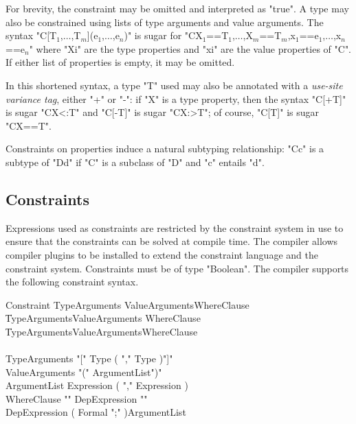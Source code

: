 For brevity, the constraint may be omitted and
interpreted as \xcd"true".
A type may also be constrained using lists of type arguments and
value arguments.
The syntax 
\xcdmath"C[T$_1$,$\dots$,T$_m$](e$_1$,$\dots$,e$_n$)" is sugar for
\xcdmath"C{X$_1$==T$_1$,$\dots$,X$_m$==T$_m$,x$_1$==e$_1$,$\dots$,x$_n$==e$_n$}"
where \xcd"Xi" are the type properties and \xcd"xi" are the
value properties of \xcd"C".  
If either list of properties is empty, it may be omitted.

In this shortened syntax, a type \xcd"T" used may also be annotated
with
a \emph{use-site variance tag}, either \xcd"+" or \xcd"-":
if \xcd"X" is a type property, then
the syntax \xcd"C[+T]" is sugar \xcd"C{X<:T}" and
\xcd"C[-T]" is sugar \xcd"C{X:>T}"; of course,
\xcd"C[T]" is sugar \xcd"C{X==T}".

Constraints on properties induce a natural subtyping relationship:
\xcd"C{c}" is a subtype of
\xcd"D{d}" if \xcd"C" is a subclass of \xcd"D" and
\xcd"c" entails \xcd"d".

\subsection{Constraints}

\def\withmath#1{\relax\ifmmode#1\else{$#1$}\fi}
\def\LL#1{\withmath{\lbrack\!\lbrack #1\rbrack\!\rbrack}}

Expressions used as constraints are restricted by the
constraint system in use to ensure that the constraints can
be solved at compile time.  The \Xten{} compiler allows compiler
plugins to be installed to extend the constraint language and
the
constraint system.
Constraints must be of type \xcd"Boolean".
The
compiler supports the following constraint syntax.

\begin{grammar}
Constraint \: TypeArguments     ValueArguments\opt WhereClause\opt \\
           \| TypeArguments\opt ValueArguments     WhereClause\opt \\
           \| TypeArguments\opt ValueArguments\opt WhereClause     \\
           \\
TypeArguments    \:  \xcd"[" Type ( \xcd"," Type )\star \xcd"]" \\
ValueArguments   \:  \xcd"(" ArgumentList\opt \xcd")" \\
ArgumentList     \:  Expression ( \xcd"," Expression )\star \\
WhereClause        \: \xcd"{" DepExpression \xcd"}" \\
DepExpression \: ( Formal \xcd";" )\star ArgumentList \\
\end{grammar}

